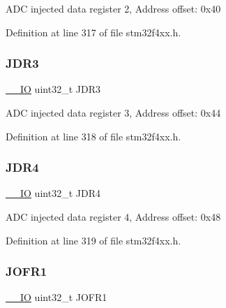 A\+DC injected data register 2, Address offset\+: 0x40 

Definition at line 317 of file stm32f4xx.\+h.

\mbox{\label{struct_a_d_c___type_def_a3a54028253a75a470fccf841178cba46}} 
\subsubsection{\texorpdfstring{J\+D\+R3}{JDR3}}
{\footnotesize\ttfamily \hyperlink{group___c_m_s_i_s__core__definitions_gaec43007d9998a0a0e01faede4133d6be}{\+\_\+\+\_\+\+IO} uint32\+\_\+t J\+D\+R3}

A\+DC injected data register 3, Address offset\+: 0x44 

Definition at line 318 of file stm32f4xx.\+h.

\mbox{\label{struct_a_d_c___type_def_a9274ceea3b2c6d5c1903d0a7abad91a1}} 
\subsubsection{\texorpdfstring{J\+D\+R4}{JDR4}}
{\footnotesize\ttfamily \hyperlink{group___c_m_s_i_s__core__definitions_gaec43007d9998a0a0e01faede4133d6be}{\+\_\+\+\_\+\+IO} uint32\+\_\+t J\+D\+R4}

A\+DC injected data register 4, Address offset\+: 0x48 

Definition at line 319 of file stm32f4xx.\+h.

\mbox{\label{struct_a_d_c___type_def_a427dda1678f254bd98b1f321d7194a3b}} 
\subsubsection{\texorpdfstring{J\+O\+F\+R1}{JOFR1}}
{\footnotesize\ttfamily \hyperlink{group___c_m_s_i_s__core__definitions_gaec43007d9998a0a0e01faede4133d6be}{\+\_\+\+\_\+\+IO} uint32\+\_\+t J\+O\+F\+R1}

